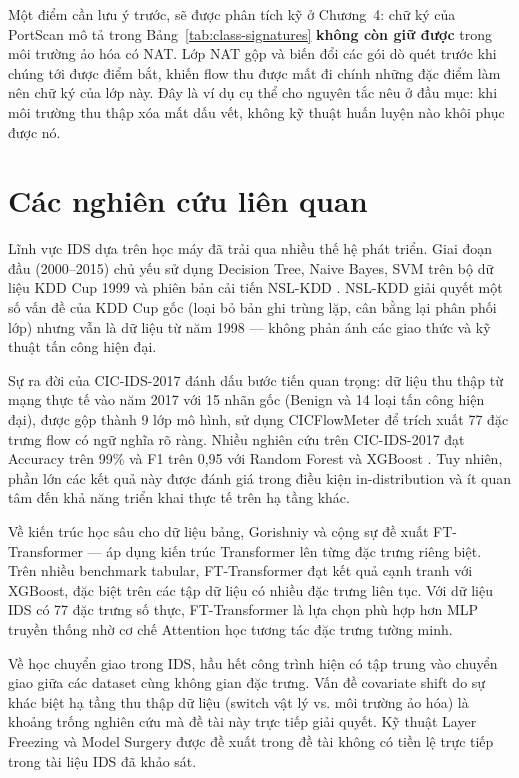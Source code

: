 \documentclass[../DoAn.tex]{subfiles}
\begin{document}
Một điểm cần lưu ý trước, sẽ được phân tích kỹ ở Chương~4: chữ ký của PortScan mô tả trong Bảng~\ref{tab:class-signatures} \textbf{không còn giữ được} trong môi trường ảo hóa có NAT. Lớp NAT gộp và biến đổi các gói dò quét trước khi chúng tới được điểm bắt, khiến flow thu được mất đi chính những đặc điểm làm nên chữ ký của lớp này. Đây là ví dụ cụ thể cho nguyên tắc nêu ở đầu mục: khi môi trường thu thập xóa mất dấu vết, không kỹ thuật huấn luyện nào khôi phục được nó.

\section{Các nghiên cứu liên quan}
\label{sec:lien-quan}

Lĩnh vực IDS dựa trên học máy đã trải qua nhiều thế hệ phát triển. Giai đoạn đầu (2000--2015) chủ yếu sử dụng Decision Tree, Naive Bayes, SVM trên bộ dữ liệu KDD Cup 1999 \cite{kdd99} và phiên bản cải tiến NSL-KDD \cite{tavallaee2009}. NSL-KDD giải quyết một số vấn đề của KDD Cup gốc (loại bỏ bản ghi trùng lặp, cân bằng lại phân phối lớp) nhưng vẫn là dữ liệu từ năm 1998 --- không phản ánh các giao thức và kỹ thuật tấn công hiện đại.

Sự ra đời của CIC-IDS-2017 \cite{sharafaldin2018} đánh dấu bước tiến quan trọng: dữ liệu thu thập từ mạng thực tế vào năm 2017 với 15 nhãn gốc (Benign và 14 loại tấn công hiện đại), được gộp thành 9 lớp mô hình, sử dụng CICFlowMeter để trích xuất 77 đặc trưng flow có ngữ nghĩa rõ ràng. Nhiều nghiên cứu trên CIC-IDS-2017 đạt Accuracy trên 99\% và F1 trên 0,95 với Random Forest và XGBoost \cite{panigrahi2018,liu2019}. Tuy nhiên, phần lớn các kết quả này được đánh giá trong điều kiện in-distribution và ít quan tâm đến khả năng triển khai thực tế trên hạ tầng khác.

Về kiến trúc học sâu cho dữ liệu bảng, Gorishniy và cộng sự \cite{gorishniy2021} đề xuất FT-Transformer --- áp dụng kiến trúc Transformer lên từng đặc trưng riêng biệt. Trên nhiều benchmark tabular, FT-Transformer đạt kết quả cạnh tranh với XGBoost, đặc biệt trên các tập dữ liệu có nhiều đặc trưng liên tục. Với dữ liệu IDS có 77 đặc trưng số thực, FT-Transformer là lựa chọn phù hợp hơn MLP truyền thống nhờ cơ chế Attention học tương tác đặc trưng tường minh.

Về học chuyển giao trong IDS, hầu hết công trình hiện có \cite{zhao2020transfer,singla2020} tập trung vào chuyển giao giữa các dataset cùng không gian đặc trưng. Vấn đề covariate shift do sự khác biệt hạ tầng thu thập dữ liệu (switch vật lý vs. môi trường ảo hóa) là khoảng trống nghiên cứu mà đề tài này trực tiếp giải quyết. Kỹ thuật Layer Freezing và Model Surgery được đề xuất trong đề tài không có tiền lệ trực tiếp trong tài liệu IDS đã khảo sát.
\end{document}
